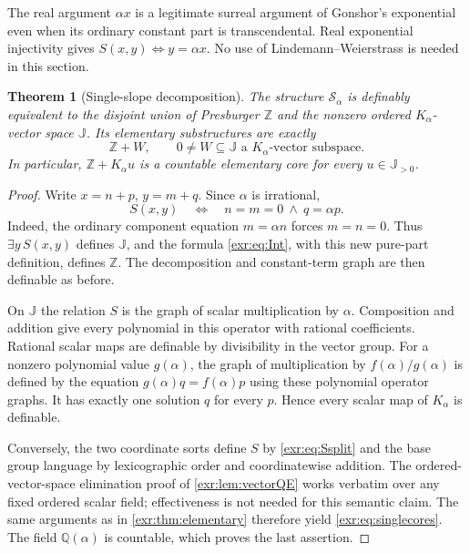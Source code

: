 \documentclass[11pt,letterpaper]{article}
\numberwithin{equation}{section}
\newtheorem{theorem}{Theorem}[section]
\theoremstyle{definition}
\theoremstyle{remark}
\newcommand{\Z}{\mathbb Z}
\newcommand{\Q}{\mathbb Q}
\newcommand{\J}{\mathbb J}
\begin{document}
The real argument $\alpha x$ is a legitimate surreal argument of Gonshor's
exponential even when its ordinary constant part is transcendental. Real
exponential injectivity gives $S(x,y)\Longleftrightarrow y=\alpha x$.
No use of Lindemann--Weierstrass is needed in this section.

\begin{theorem}[Single-slope decomposition]\label{exr:thm:single}
The structure $\mathcal S_\alpha$ is definably equivalent to the disjoint union
of Presburger $\Z$ and the nonzero ordered $K_\alpha$-vector space $\J$.
Its elementary substructures are exactly
\begin{equation}\label{exr:eq:singlecores}
 \Z+W,\qquad 0\ne W\subseteq\J\text{ a }K_\alpha\text{-vector subspace}.
\end{equation}
In particular, $\Z+K_\alpha u$ is a countable elementary core for every
$u\in\J_{>0}$.
\end{theorem}
\begin{proof}
Write $x=n+p$, $y=m+q$. Since $\alpha$ is irrational,
\begin{equation}\label{exr:eq:Ssplit}
 S(x,y)\quad\Longleftrightarrow\quad n=m=0\ \land\ q=\alpha p.
\end{equation}
Indeed, the ordinary component equation $m=\alpha n$ forces $m=n=0$.
Thus $\exists y\,S(x,y)$ defines $\J$, and the formula \eqref{exr:eq:Int}, with this
new pure-part definition, defines $\Z$. The decomposition and constant-term graph
are then definable as before.

On $\J$ the relation $S$ is the graph of scalar multiplication by $\alpha$.
Composition and addition give every polynomial in this operator with rational
coefficients. Rational scalar maps are definable by divisibility in the vector
group. For a nonzero polynomial value $g(\alpha)$, the graph of multiplication by
$f(\alpha)/g(\alpha)$ is defined by the equation
$g(\alpha)q=f(\alpha)p$ using these polynomial operator graphs. It has exactly one
solution $q$ for every $p$. Hence every scalar map of $K_\alpha$ is definable.

Conversely, the two coordinate sorts define $S$ by \eqref{exr:eq:Ssplit} and the base
group language by lexicographic order and coordinatewise addition. The
ordered-vector-space elimination proof of \cref{exr:lem:vectorQE} works verbatim over
any fixed ordered scalar field; effectiveness is not needed for this semantic
claim. The same arguments as in \cref{exr:thm:elementary} therefore yield
\eqref{exr:eq:singlecores}. The field $\Q(\alpha)$ is countable, which proves the last
assertion.
\end{proof}
\end{document}
